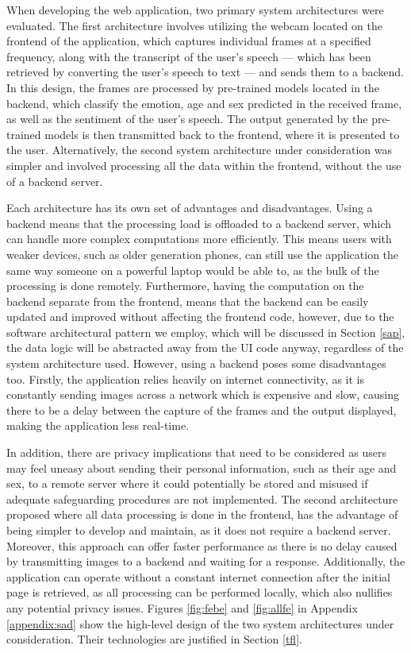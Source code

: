 \documentclass[12pt, a4paper]{article}
\newcommand{\np}
    {
    \vskip 0.4cm
    }
\begin{document}
When developing the web application, two primary system architectures were evaluated. The first architecture involves utilizing the webcam located on the frontend of the application, which captures individual frames at a specified frequency, along with the transcript of the user's speech --- which has been retrieved by converting the user's speech to text --- and sends them to a backend. In this design, the frames are processed by pre-trained models located in the backend, which classify the emotion, age and sex predicted in the received frame, as well as the sentiment of the user's speech. The output generated by the pre-trained models is then transmitted back to the frontend, where it is presented to the user. Alternatively, the second system architecture under consideration was simpler and involved processing all the data within the frontend, without the use of a backend server.
\np
Each architecture has its own set of advantages and disadvantages. Using a backend means that the processing load is offloaded to a backend server, which can handle more complex computations more efficiently. This means users with weaker devices, such as older generation phones, can still use the application the same way someone on a powerful laptop would be able to, as the bulk of the processing is done remotely. Furthermore, having the computation on the backend separate from the frontend, means that the backend can be easily updated and improved without affecting the frontend code, however, due to the software architectural pattern we employ, which will be discussed in Section \ref{sap}, the data logic will be abstracted away from the UI code anyway, regardless of the system architecture used. However, using a backend poses some disadvantages too. Firstly, the application relies heavily on internet connectivity, as it is constantly sending images across a network which is expensive and slow, causing there to be a delay between the capture of the frames and the output displayed, making the application less real-time. 
\np
In addition, there are privacy implications that need to be considered as users may feel uneasy about sending their personal information, such as their age and sex, to a remote server where it could potentially be stored and misused if adequate safeguarding procedures are not implemented. The second architecture proposed where all data processing is done in the frontend, has the advantage of being simpler to develop and maintain, as it does not require a backend server. Moreover, this approach can offer faster performance as there is no delay caused by transmitting images to a backend and waiting for a response. Additionally, the application can operate without a constant internet connection after the initial page is retrieved, as all processing can be performed locally, which also nullifies any potential privacy issues. Figures \ref{fig:febe} and \ref{fig:allfe} in Appendix \ref{appendix:sad} show the high-level design of the two system architectures under consideration. Their technologies are justified in Section \ref{tfl}.
\end{document}
